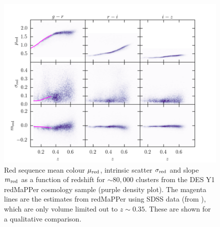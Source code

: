 {\begin{figure}
\includegraphics[width=1\textwidth]{./chapters/chapter6/figs/3x3_Mar18.png}
\caption{Red sequence mean colour $\mu_{\rm red}$, intrinsic scatter $\sigma_{\rm red}$ and slope $m_{\rm red}$ as a function of redshift for $\sim80,000$ clusters from the DES Y1 redMaPPer cosmology sample (purple density plot). The magenta lines are the estimates from redMaPPer using SDSS data (from \citealt{redpaper}), which are only volume limited out to $z\sim0.35$. These are shown for a qualitative comparison.}\label{fig:3x3}\end{figure}

}
